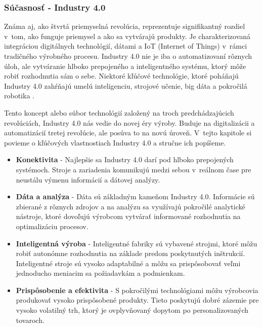 \subsubsection{Súčasnosť - Industry 4.0}

Známa aj, ako štvrtá priemyselná revolúcia, reprezentuje signifikantný rozdiel v~tom, ako funguje priemysel a ako sa vytvárajú produkty. Je charakterizovaná integráciou digitálnych technológií, dátami a IoT (Internet of Things) v~rámci tradičného výrobného procesu. Industry 4.0 nie je iba o automatizovaní rôznych úloh, ale vytváranie hlboko prepojeného a inteligentného systému, ktorý môže robiť rozhodnutia sám o sebe. Niektoré kľúčové technológie, ktoré poháňajú Industry 4.0 zahŕňajú umelú inteligenciu, strojové učenie, big dáta a pokročilá robotika \cite{rajan2023industry40}. 

Tento koncept alebo súbor technológií založený na troch predchádzajúcich revolúciách, Industry 4.0 nás vedie do novej éry výroby. Buduje na digitalizácii a automatizácií tretej revolúcie, ale posúva to na novú úroveň. V~tejto kapitole si povieme o kľúčových vlastnostiach Industry 4.0 a stručne ich popíšeme.%

\begin{itemize}
    \item \textbf{Konektivita} - Najlepšie sa Industry 4.0 darí pod hlboko prepojených systémoch. Stroje a zariadenia komunikujú medzi sebou v~reálnom čase pre neustálu výmenu informácií a dátovej analýzy.
    
    \item \textbf{Dáta a analýza} - Dáta sú základným kameňom Industry 4.0. Informácie sú zbierané z rôznych zdrojov a na analýzu sa využívajú pokročilé analytické nástroje, ktoré dovoľujú výrobcom vytvárať informované rozhodnutia na optimalizáciu procesov.
    
    \item \textbf{Inteligentná výroba} - Inteligentné fabriky sú vybavené strojmi, ktoré môžu robiť autonómne rozhodnutia na základe predom poskytnutých inštrukcií. Inteligentné stroje sú vysoko adaptabilné a môžu sa prispôsobovať veľmi jednoducho meniacim sa požiadavkám a podmienkam.
    
    \item \textbf{Prispôsobenie a efektivita} - S pokročilými technológiami môžu výrobcovia produkovať vysoko prispôsobené produkty. Tieto poskytujú dobré zázemie pre vysoko volatilný trh, ktorý je ovplyvňovaný dopytom po personalizovaných tovaroch.
\end{itemize}

